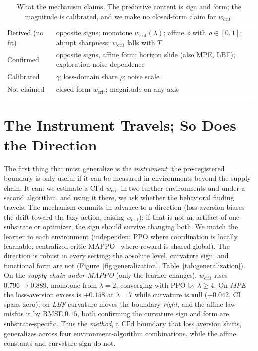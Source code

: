 \documentclass[letterpaper]{article} %
\theoremstyle{plain}
\newcommand{\wcrit}{w_{\mathrm{crit}}}
\begin{document}
\begin{table}[t]
\centering
\caption{What the mechanism claims. The predictive content is sign and form; the magnitude is
calibrated, and we make no closed-form claim for $\wcrit$.}
\label{tab:ledger}
{\setlength{\tabcolsep}{4pt}\small
\begin{tabular}{@{}lp{}@{}}
\toprule
Derived (no fit) & opposite signs; monotone $\wcrit(\lambda)$; affine $\phi$ with $\rho\in[0,1]$; abrupt sharpness; $\wcrit$ falls with $T$ \\
\addlinespace
Confirmed & opposite signs, affine form; horizon slide (also MPE, LBF); exploration-noise dependence \\
\addlinespace
Calibrated & $\gamma$; loss-domain share $\rho$; noise scale \\
\addlinespace
Not claimed & closed-form $\wcrit$; magnitude on any axis \\
\bottomrule
\end{tabular}}
\end{table}

\section{The Instrument Travels; So Does the Direction}
\label{sec:generalization}

The first thing that must generalize is the \emph{instrument}: the pre-registered boundary is only
useful if it can be measured in environments beyond the supply chain. It can: we estimate a
CI'd $\wcrit$ in two further environments and under a second algorithm, and using it there, we ask
whether the behavioral finding travels. The mechanism commits in advance to a direction (loss
aversion biases the drift toward the lazy action, raising $\wcrit$); if that is not an artifact of one substrate or
optimizer, the sign should survive changing both. We match the learner to each environment
(independent PPO where coordination is locally learnable; centralized-critic
MAPPO~\citep{yu2022surprising} where reward is shared-global). The direction is robust in every
setting; the absolute level, curvature sign, and functional form are not
(Figure~\ref{fig:generalization}, Table~\ref{tab:generalization}).
On the \emph{supply chain under MAPPO} (only the learner changes), $\wcrit$ rises $0.796\to0.889$,
monotone from $\lambda{=}2$, converging with PPO by $\lambda\!\geq\!4$. On \emph{MPE} the
loss-aversion excess is $+0.158$ at $\lambda{=}7$ while curvature is null ($+0.042$, CI spans zero);
on \emph{LBF} curvature moves the boundary \emph{right}, and the affine law misfits it by RMSE
$0.15$, both confirming the curvature sign and form are substrate-specific. Thus the
\emph{method}, a CI'd boundary that loss aversion shifts, generalizes across four
environment-algorithm combinations, while the affine constants and curvature sign do not.
\end{document}
